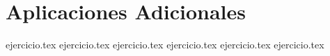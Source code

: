 \section*{Aplicaciones Adicionales}

\begin{enumerate}
    {ejercicio.tex}
\vspace{0.5cm}
    {ejercicio.tex}
\vspace{0.5cm}
    {ejercicio.tex}
\vspace{0.5cm}
    {ejercicio.tex}
\vspace{0.5cm}
    {ejercicio.tex}
\vspace{0.5cm}
    {ejercicio.tex}
\end{enumerate}
